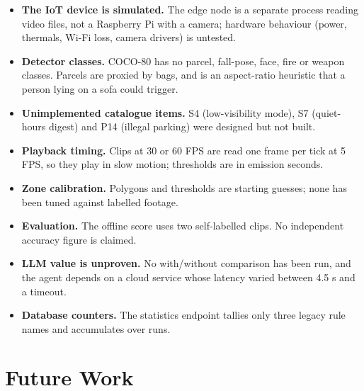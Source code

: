 \documentclass[11pt]{article}
\DeclareRobustCommand{\code}[1]{\texttt{\detokenize{#1}}}
\begin{document}
\begin{itemize}
  \item \textbf{The IoT device is simulated.} The edge node is a separate process reading video files, not a Raspberry Pi with a camera; hardware behaviour (power, thermals, Wi-Fi loss, camera drivers) is untested.
  \item \textbf{Detector classes.} COCO-80 has no parcel, fall-pose, face, fire or weapon classes. Parcels are proxied by bags, and \code{person_down} is an aspect-ratio heuristic that a person lying on a sofa could trigger.
  \item \textbf{Unimplemented catalogue items.} S4 (low-visibility mode), S7 (quiet-hours digest) and P14 (illegal parking) were designed but not built.
  \item \textbf{Playback timing.} Clips at 30 or 60 FPS are read one frame per tick at 5 FPS, so they play in slow motion; thresholds are in emission seconds.
  \item \textbf{Zone calibration.} Polygons and thresholds are starting guesses; none has been tuned against labelled footage.
  \item \textbf{Evaluation.} The offline score uses two self-labelled clips. No independent accuracy figure is claimed.
  \item \textbf{LLM value is unproven.} No with/without comparison has been run, and the agent depends on a cloud service whose latency varied between 4.5 s and a timeout.
  \item \textbf{Database counters.} The statistics endpoint tallies only three legacy rule names and accumulates over runs.
\end{itemize}

\section{Future Work}
\end{document}
